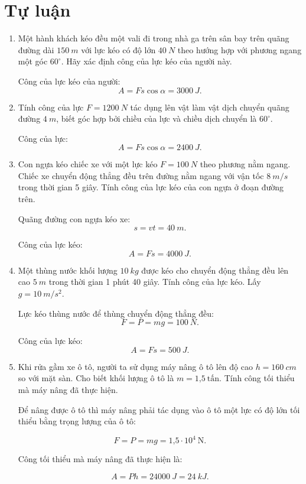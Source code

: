 \section{Tự luận}
\begin{enumerate}[label=\bfseries Câu \arabic*:, leftmargin=1.5cm]
	\item {}
	
	
	{
		Một hành khách kéo đều một vali đi trong nhà ga trên sân bay trên quãng đường dài $\SI{150}{m}$ với lực kéo có độ lớn $\SI{40}{N}$ theo hướng hợp với phương ngang một góc $60^\circ$. Hãy xác định công của lực kéo của người này.
	}
	
	\hideall
	{	
		Công của lực kéo của người: $$A=Fs\cos \alpha = \SI{3000}{J}.$$
	}
	
	\item {}
	
	
	{
		Tính công của lực $F=\SI{1200}{N}$ tác dụng lên vật làm vật dịch chuyển quãng đường $\SI{4}{m}$, biết góc hợp bởi chiều của lực và chiều dịch chuyển là $60^\circ$.
	}
	
	\hideall
	{	
		Công của lực: $$A=Fs\cos \alpha = \SI{2400}{J}.$$
	}
	
	\item {}
	
	
	{
		Con ngựa kéo chiếc xe với một lực kéo $F=\SI{100}{N}$ theo phương nằm ngang. Chiếc xe chuyển động thẳng đều trên đường nằm ngang với vận tốc $\SI{8}{m/s}$ trong thời gian 5 giây. Tính công của lực kéo của con ngựa ở đoạn đường trên. 
	}
	
	\hideall
	{	
		Quãng đường con ngựa kéo xe:
		$$s=vt=\SI{40}{m}.$$
		
		Công của lực kéo:
		$$A=Fs=\SI{4000}{J}.$$
	}
	\item {}
	
	
	{
		Một thùng nước khối lượng $\SI{10}{kg}$ được kéo cho chuyển động thẳng đều lên cao $\SI{5}{m}$ trong thời gian 1 phút 40 giây. Tính công của lực kéo. Lấy $g=\SI{10}{m/s^2}$.
	}
	
	\hideall
	{	
		Lực kéo thùng nước để thùng chuyển động thẳng đều:
		$$F=P=mg=\SI{100}{N}.$$
		
		Công của lực kéo:
		$$A=Fs=\SI{500}{J}.$$
	}
	\item {}
	
	
	{
		Khi rửa gầm xe ô tô, người ta sử dụng máy nâng ô tô lên độ cao $h = \SI{160}{cm}$ so với mặt sàn. Cho biết khối lượng ô tô là $m = \text{1,5}\ \text{tấn}$. Tính công tối thiểu mà máy nâng đã thực hiện.
	}
	
	\hideall
	{	
		Để nâng được ô tô thì máy nâng phải tác dụng vào ô tô một lực có độ lớn tối thiểu bằng trọng lượng của ô tô:
		
		$$F = P =mg = \text{1,5} \cdot 10^4\ \text{N}.$$
		
		Công tối thiểu mà máy nâng đã thực hiện là:
		
		$$A = Ph = \SI{24000}{J} = \SI{24}{kJ}.$$
		
	}
	
	
\end{enumerate}